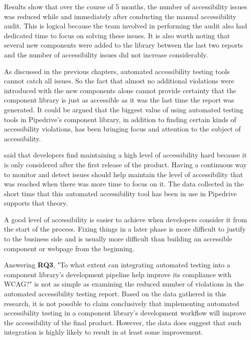 \documentclass{master_thesis}
\begin{document}
Results show that over the course of 5 months, the number of accessibility issues was reduced while and immediately after conducting the manual accessibility audit. This is logical because the team involved in performing the audit also had dedicated time to focus on solving these issues. It is also worth noting that several new components were added to the library between the last two reports and the number of accessibility issues did not increase considerably.

As discussed in the previous chapters, automated accessibility testing tools cannot catch all issues. So the fact that almost no additional violations were introduced with the new components alone cannot provide certainty that the component library is just as accessible as it was the last time the report was generated. It could be argued that the biggest value of using automated testing tools in Pipedrive's component library, in addition to finding certain kinds of accessibility violations, has been bringing focus and attention to the subject of accessibility.

\citeauthor{Paterno2020} said that developers find maintaining a high level of accessibility hard because it is only considered after the first release of the product. Having a continuous way to monitor and detect issues should help maintain the level of accessibility that was reached when there was more time to focus on it. The data collected in the short time that this automated accessibility tool has been in use in Pipedrive supports that theory.

A good level of accessibility is easier to achieve when developers consider it from the start of the process. Fixing things in a later phase is more difficult to justify to the business side and is usually more difficult than building an accessible component or webpage from the beginning.


Answering \textbf{RQ3}, "To what extent can integrating automated testing into a component library's development pipeline help improve its compliance with WCAG?" is not as simple as examining the reduced number of violations in the automated accessibility testing report. Based on the data gathered in this research, it is not possible to claim conclusively that implementing automated accessibility testing in a component library's development workflow will improve the accessibility of the final product. However, the data does suggest that such integration is highly likely to result in at least some improvement.
\end{document}
